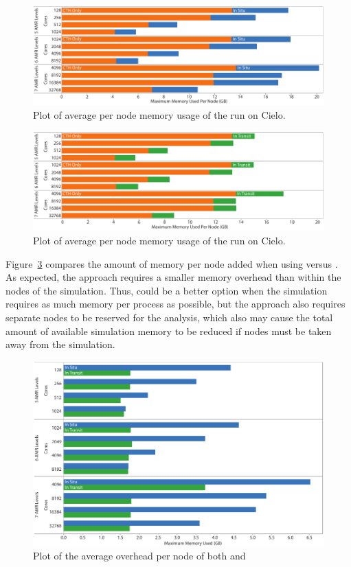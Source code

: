 \begin{figure}[htb]
  \centering
  \includegraphics[width=\linewidth]{figures/MemoryUsageInSituPerNode}
  \caption{Plot of average per node memory usage of the \insitu run on Cielo.}
  \label{fig:MemoryInSituPerNode}
\end{figure}

\begin{figure}[htb]
  \centering
  \includegraphics[width=\linewidth]{figures/MemoryUsageInTransitPerNode}
  \caption{Plot of average per node memory usage of the \intransit run on Cielo.}
  \label{fig:MemoryInTransitPerNode}
\end{figure}

Figure~\ref{fig:MemoryCompare} compares the amount of memory per node added
when using \insitu versus \intransit.  As expected, the \intransit approach
requires a smaller memory overhead than \insitu within the nodes of the
simulation.  Thus, \intransit could be a better option when the simulation
requires as much memory per process as possible, but the \intransit
approach also requires separate nodes to be reserved for the analysis,
which also may cause the total amount of available simulation memory to be
reduced if nodes must be taken away from the simulation.

\begin{figure}[htb]
  \centering
  \includegraphics[width=\linewidth]{figures/MemoryUsageCompare}
  \caption{Plot of the average overhead per node of both \insitu and \intransit}
  \label{fig:MemoryCompare}
\end{figure}


